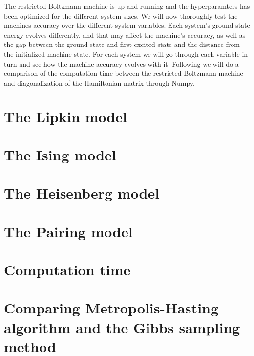 The restricted Boltzmann machine is up and running and the hyperparamters has been optimized for the different system sizes. We will now thoroughly test the machines accuracy over the different system variables. Each system's ground state energy evolves differently, and that may affect the machine's accuracy, as well as the gap between the ground state and first excited state and the distance from the initialized machine state. For each system we will go through each variable in turn and see how the machine accuracy evolves with it. Following we will do a comparison of the computation time between the restricted Boltzmann machine and diagonalization of the Hamiltonian matrix through Numpy\cite{harris2020array}.

\chapter{The Lipkin model}

\chapter{The Ising model}

\chapter{The Heisenberg model}

\chapter{The Pairing model}

\chapter{Computation time}

\chapter{Comparing Metropolis-Hasting algorithm and the Gibbs sampling method}


